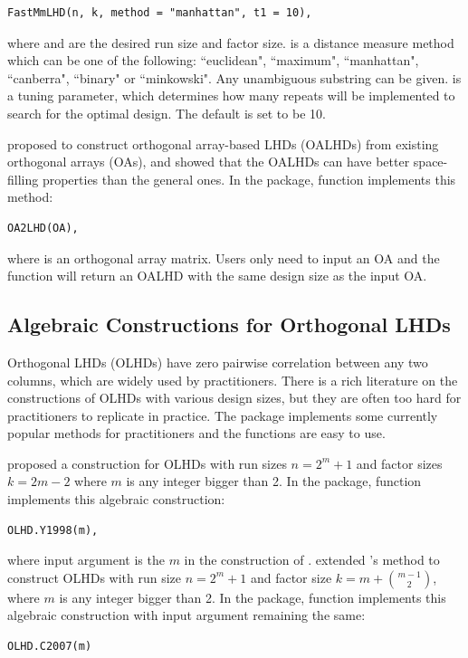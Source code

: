 \begin{verbatim}
FastMmLHD(n, k, method = "manhattan", t1 = 10),
\end{verbatim}

\noindent where  and  are the desired run size and factor size.  is a distance measure method which can be one of the following: ``euclidean", ``maximum", ``manhattan", ``canberra", ``binary" or ``minkowski". Any unambiguous substring can be given.  is a tuning parameter, which determines how many repeats will be implemented to search for the optimal design. The default is set to be 10.

\cite{tang1993orthogonal} proposed to construct orthogonal array-based LHDs (OALHDs) from existing orthogonal arrays (OAs), and \cite{tang1993orthogonal} showed that the OALHDs can have better space-filling properties than the general ones. In the  package, function  implements this method:
{\small
	\begin{verbatim}
OA2LHD(OA),
	\end{verbatim}
}

\noindent where  is an orthogonal array matrix. Users only need to input an OA and the function will return an OALHD with the same design size as the input OA.

\subsection{Algebraic Constructions for Orthogonal LHDs}
\label{sec:olhd}

Orthogonal LHDs (OLHDs) have zero pairwise correlation between any two columns, which are widely used by practitioners. There is a rich literature on the constructions of OLHDs with various design sizes, but they are often too hard for practitioners to replicate in practice. The  package implements some currently popular methods \citep{ye1998orthogonal, cioppa2007efficient, sun2010construction, tang1993orthogonal, lin2009construction, butler2001optimal} for practitioners and the functions are easy to use.

\cite{ye1998orthogonal} proposed a construction for OLHDs with run sizes $n=2^m+1$ and factor sizes $k=2m-2$ where $m$ is any integer bigger than 2. In the  package, function  implements this algebraic construction:
{\small
	\begin{verbatim}
OLHD.Y1998(m),
	\end{verbatim}
}
\noindent where input argument  is the $m$ in the construction of \cite{ye1998orthogonal}. \cite{cioppa2007efficient} extended \cite{ye1998orthogonal}'s method to construct OLHDs with run size $n=2^m+1$ and factor size $k=m+ {m-1 \choose 2}$, where $m$ is any integer bigger than 2. In the  package, function  implements this algebraic construction with input argument  remaining the same:
{\small
	\begin{verbatim}
OLHD.C2007(m)
	\end{verbatim}
}


